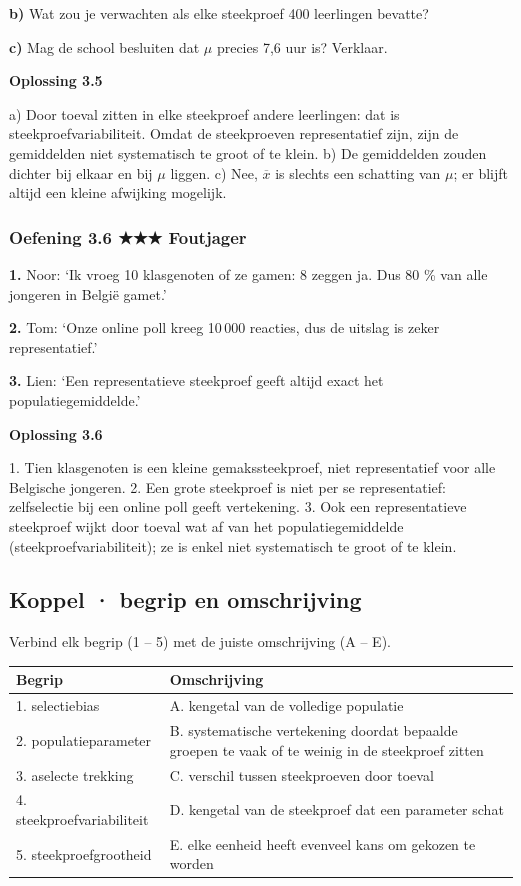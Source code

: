 \textbf{b)} Wat zou je verwachten als elke steekproef 400 leerlingen bevatte? \lijn

\textbf{c)} Mag de school besluiten dat $\mu$ precies 7,6 uur is? Verklaar. \lijn

\begin{oplossing}
\textbf{Oplossing 3.5}

a) Door toeval zitten in elke steekproef andere leerlingen: dat is steekproefvariabiliteit. Omdat de steekproeven representatief zijn, zijn de gemiddelden niet systematisch te groot of te klein. b) De gemiddelden zouden dichter bij elkaar en bij $\mu$ liggen. c) Nee, $\overline{x}$ is slechts een schatting van $\mu$; er blijft altijd een kleine afwijking mogelijk.
\end{oplossing}

\subsubsection*{Oefening 3.6 \quad ★★★ \quad Foutjager}

\textbf{1.} Noor: ‘Ik vroeg 10 klasgenoten of ze gamen: 8 zeggen ja. Dus 80 \% van alle jongeren in België gamet.’ \lijn

\textbf{2.} Tom: ‘Onze online poll kreeg 10\,000 reacties, dus de uitslag is zeker representatief.’ \lijn

\textbf{3.} Lien: ‘Een representatieve steekproef geeft altijd exact het populatiegemiddelde.’ \lijn

\begin{oplossing}
\textbf{Oplossing 3.6}

1. Tien klasgenoten is een kleine gemakssteekproef, niet representatief voor alle Belgische jongeren. 2. Een grote steekproef is niet per se representatief: zelfselectie bij een online poll geeft vertekening. 3. Ook een representatieve steekproef wijkt door toeval wat af van het populatiegemiddelde (steekproefvariabiliteit); ze is enkel niet systematisch te groot of te klein.
\end{oplossing}

\subsection*{Koppel · begrip en omschrijving}

Verbind elk begrip (1 – 5) met de juiste omschrijving (A – E).

\begin{tabular}{ll}
\hline
Begrip & Omschrijving \\
\hline
1. selectiebias & A. kengetal van de volledige populatie \\
2. populatieparameter & B. systematische vertekening doordat bepaalde groepen te vaak of te weinig in de steekproef zitten \\
3. aselecte trekking & C. verschil tussen steekproeven door toeval \\
4. steekproefvariabiliteit & D. kengetal van de steekproef dat een parameter schat \\
5. steekproefgrootheid & E. elke eenheid heeft evenveel kans om gekozen te worden \\
\hline
\end{tabular}

